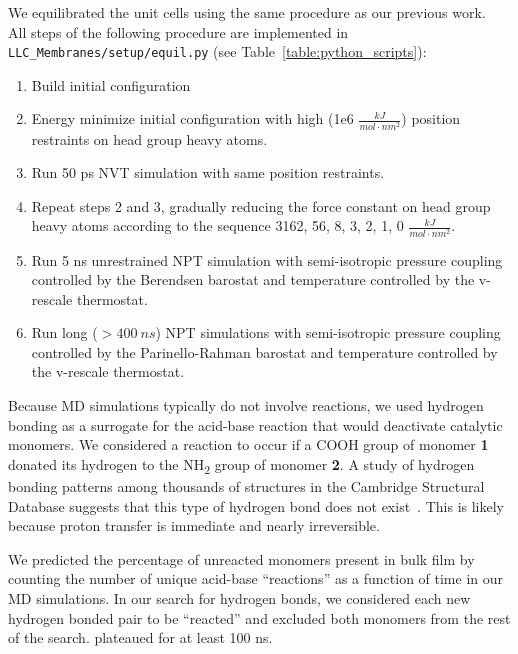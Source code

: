 \documentclass{article}
\begin{document}
  We equilibrated the unit cells using the same procedure as our previous
  work.~\cite{coscia_understanding_2019} All steps of the following
  procedure are implemented in \texttt{LLC\_Membranes/setup/equil.py} 
  (see Table~\ref{table:python_scripts}):
  \begin{enumerate}
  	\item Build initial configuration
  	\item Energy minimize initial configuration with high (1e6 $\frac{kJ}{mol \cdot nm^2}$)
  	position restraints on head group heavy atoms. 
  	\item Run 50 ps NVT simulation with same position restraints.
  	\item Repeat steps 2 and 3, gradually reducing the force constant on head
  	group heavy atoms according to the sequence 3162, 56, 8, 3, 2, 1, 0 $\frac{kJ}{mol \cdot nm^2}$.
  	\item Run 5 ns unrestrained NPT simulation with semi-isotropic pressure 
  	coupling controlled by the Berendsen barostat and temperature controlled by the 
  	v-rescale thermostat.
  	\item Run long ($> 400~ns$) NPT simulations with semi-isotropic pressure
  	coupling controlled by the Parinello-Rahman barostat and temperature controlled by
  	the v-rescale thermostat.
  \end{enumerate}
  
  Because MD simulations typically do not involve reactions, we used hydrogen
  bonding as a surrogate for the acid-base reaction that would deactivate
  catalytic monomers. We considered a reaction to occur if a COOH group of monomer
  \textbf{1} donated its hydrogen to the NH\textsubscript{2} group of monomer
  \textbf{2}. A study of hydrogen bonding patterns among thousands of structures 
  in the Cambridge Structural Database suggests that this type of hydrogen
  bond does not exist~\cite{gilli_predicting_2009}. This is likely because proton
  transfer is immediate and nearly irreversible. %
  
  We predicted the percentage of unreacted monomers present in bulk film by
  counting the number of unique acid-base ``reactions'' as a function of time in 
  our MD simulations. In our search for hydrogen bonds, we considered each new 
  hydrogen bonded pair to be ``reacted'' and excluded both monomers from the rest
  of the search. 
  plateaued for at least 100 ns.
  
\end{document}
